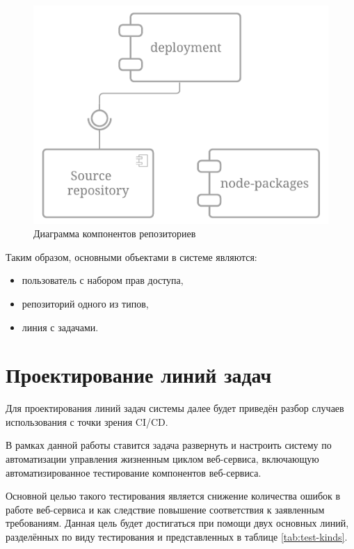 \begin{figure}[ht]
    \centering
    \includegraphics[scale=0.4]{src/figures/repository-components}
    \caption{Диаграмма компонентов репозиториев}
    \label{fig:repository-components}
\end{figure}

Таким образом, основными объектами в системе являются:
\begin{itemize}
    \item пользователь с набором прав доступа,
    \item репозиторий одного из типов,
    \item линия с задачами.
\end{itemize}

\section{Проектирование линий задач}

Для проектирования линий задач системы далее будет приведён разбор случаев использования с точки зрения CI/CD.

В рамках данной работы ставится задача развернуть и настроить систему по автоматизации управления жизненным циклом веб-сервиса,
включающую автоматизированное тестирование компонентов веб-сервиса.

Основной целью такого тестирования является снижение количества ошибок в работе веб-сервиса и как следствие повышение соответствия к заявленным требованиям.
Данная цель будет достигаться при помощи двух основных линий, разделённых по виду тестирования и представленных в таблице \ref{tab:test-kinds}.

